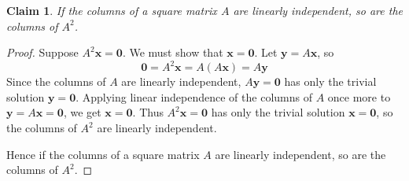 \documentclass{article}
\newtheorem*{claim}{Claim}
\begin{document}
\begin{claim}
    If the columns of a square matrix $A$ are linearly independent, so are the columns of $A^2$.
\end{claim}

\begin{proof}
    Suppose $A^2\mathbf{x} = \mathbf{0}$. We must show that $\mathbf{x} = \mathbf{0}$. Let 
    $\mathbf{y} = A\mathbf{x}$, so 
    \[
    \mathbf{0} = A^2\mathbf{x} = A(A\mathbf{x}) = A\mathbf{y}
    \]
    Since the columns of $A$ are linearly independent, $A\mathbf{y} = \mathbf{0}$ has only the trivial solution 
    $\mathbf{y} = \mathbf{0}$. Applying linear independence of the columns of $A$ once more to 
    $\mathbf{y} = A\mathbf{x} = \mathbf{0}$, we get $\mathbf{x} = \mathbf{0}$. Thus $A^2\mathbf{x} = \mathbf{0}$
    has only the trivial solution $\mathbf{x} = \mathbf{0}$, so the columns of $A^2$ are linearly independent.

    \medskip

    Hence if the columns of a square matrix $A$ are linearly independent, so are the columns of $A^2$.
\end{proof}
\end{document}
